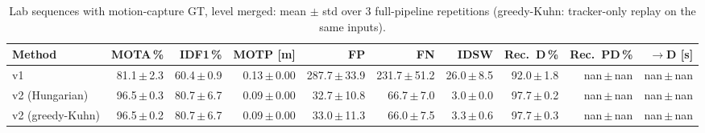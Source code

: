 \begin{table}[t]
\centering
\caption{Lab sequences with motion-capture GT, level merged: mean $\pm$ std over 3 full-pipeline repetitions (greedy-Kuhn: tracker-only replay on the same inputs).}
\label{tab:own_r8_merged_reps}
\setlength{\tabcolsep}{3pt}
\begin{tabular}{lrrrrrrrrr}
\toprule
Method & MOTA\,\% & IDF1\,\% & MOTP [m] & FP & FN & IDSW & Rec.\ D\,\% & Rec.\ PD\,\% & $\to$D [s] \\
\midrule
v1 & 81.1\,$\pm$\,2.3 & 60.4\,$\pm$\,0.9 & 0.13\,$\pm$\,0.00 & 287.7\,$\pm$\,33.9 & 231.7\,$\pm$\,51.2 & 26.0\,$\pm$\,8.5 & 92.0\,$\pm$\,1.8 & nan\,$\pm$\,nan & nan\,$\pm$\,nan \\
v2 (Hungarian) & 96.5\,$\pm$\,0.3 & 80.7\,$\pm$\,6.7 & 0.09\,$\pm$\,0.00 & 32.7\,$\pm$\,10.8 & 66.7\,$\pm$\,7.0 & 3.0\,$\pm$\,0.0 & 97.7\,$\pm$\,0.2 & nan\,$\pm$\,nan & nan\,$\pm$\,nan \\
v2 (greedy-Kuhn) & 96.5\,$\pm$\,0.2 & 80.7\,$\pm$\,6.7 & 0.09\,$\pm$\,0.00 & 33.0\,$\pm$\,11.3 & 66.0\,$\pm$\,7.5 & 3.3\,$\pm$\,0.6 & 97.7\,$\pm$\,0.3 & nan\,$\pm$\,nan & nan\,$\pm$\,nan \\
\bottomrule
\end{tabular}
\end{table}
